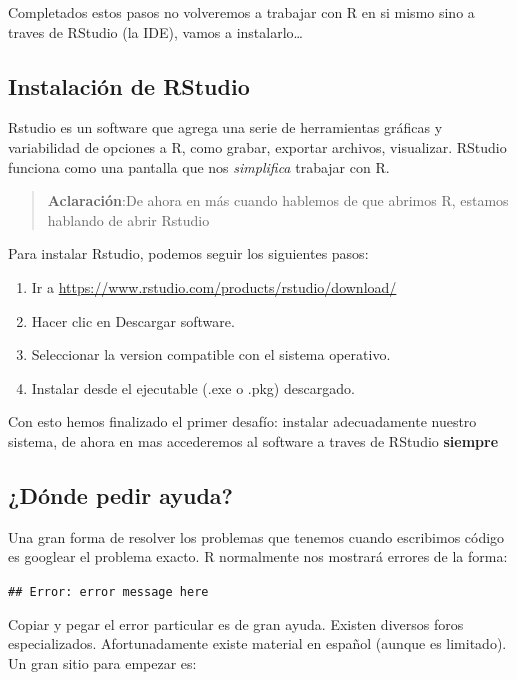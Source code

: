 \documentclass[
]{book}
\providecommand{\tightlist}{%
  \setlength{\itemsep}{0pt}\setlength{\parskip}{0pt}}
\begin{document}
Completados estos pasos no volveremos a trabajar con R en si mismo sino a traves de RStudio (la IDE), vamos a instalarlo\ldots{}

\hypertarget{instalaciuxf3n-de-rstudio}{%
\subsection{Instalación de RStudio}\label{instalaciuxf3n-de-rstudio}}

Rstudio es un software que agrega una serie de herramientas gráficas y variabilidad de opciones a R, como grabar, exportar archivos, visualizar. RStudio funciona como una pantalla que nos \emph{simplifica} trabajar con R.

\begin{quote}
\textbf{Aclaración}:De ahora en más cuando hablemos de que abrimos R, estamos hablando de abrir Rstudio
\end{quote}

Para instalar Rstudio, podemos seguir los siguientes pasos:

\begin{enumerate}
\def\labelenumi{\arabic{enumi}.}
\tightlist
\item
  Ir a \url{https://www.rstudio.com/products/rstudio/download/}
\item
  Hacer clic en Descargar software.
\item
  Seleccionar la version compatible con el sistema operativo.
\item
  Instalar desde el ejecutable (.exe o .pkg) descargado.
\end{enumerate}

Con esto hemos finalizado el primer desafío: instalar adecuadamente nuestro sistema, de ahora en mas accederemos al software a traves de RStudio \textbf{siempre}

\hypertarget{duxf3nde-pedir-ayuda}{%
\subsection{¿Dónde pedir ayuda?}\label{duxf3nde-pedir-ayuda}}

Una gran forma de resolver los problemas que tenemos cuando escribimos código es googlear el problema exacto. R normalmente nos mostrará errores de la forma:

\texttt{\#\#\ Error:\ error\ message\ here}

Copiar y pegar el error particular es de gran ayuda. Existen diversos foros especializados. Afortunadamente existe material en español (aunque es limitado). Un gran sitio para empezar es:
\end{document}
